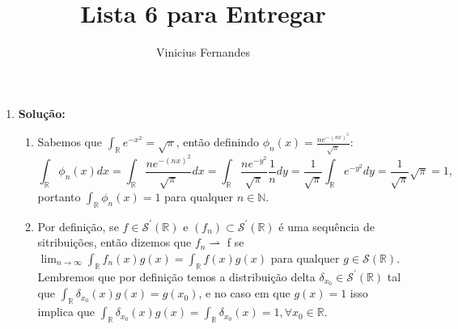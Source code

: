 \documentclass{article}
\begin{document}
	
	\title{Lista 6 para Entregar}
	\author{Vinicius Fernandes}
	
	\maketitle
	
	\begin{enumerate}
		
		\item \textbf{Solução:} 
			\begin{enumerate}
				\item Sabemos que $\int_{\mathbb{R}} e^{-x^{2}} = \sqrt{\pi}$, então definindo $\phi_{n}(x) = \frac{ne^{-(nx)^{2}}}{\sqrt{\pi}}$:
				$$
				\int_{\mathbb{R}}\phi_{n}(x)dx= 				\int_{\mathbb{R}} \frac{ne^{-(nx)^{2}}}{\sqrt{\pi}} dx = \int_{\mathbb{R}} \frac{ne^{-y^{2}}}{\sqrt{\pi}} \frac{1}{n} dy = \frac{1}{\sqrt{\pi}} \int_{\mathbb{R}} e^{-y^{2}} dy = \frac{1}{\sqrt{\pi}}  \sqrt{\pi} = 1,
				$$
				portanto $\int_{\mathbb{R}}\phi_{n}(x) = 1$ para qualquer $n \in \mathbb{N}$.
				
				\item Por definição, se $f \in \mathcal{S}^{'}(\mathbb{R})$ e $(f_{n}) \subset \mathcal{S}^{'}(\mathbb{R})$ é uma sequência de sitribuições, então dizemos que $f_{n} \rightharpoonup$ f se $\lim_{n \to \infty} \int_{\mathbb{R}}f_{n}(x)g(x) = \int_{\mathbb{R}}f(x)g(x)$ para qualquer $g \in \mathcal{S}(\mathbb{R})$. Lembremos que por definição temos a distribuição delta $\delta_{x_{0}} \in \mathcal{S}^{'}(\mathbb{R})$ tal que $\int_{\mathbb{R}}\delta_{x_0}(x)g(x) = g(x_{0})$, e no caso em que $g(x) = 1$ isso implica que $\int_{\mathbb{R}}\delta_{x_0}(x)g(x) = \int_{\mathbb{R}}\delta_{x_0}(x) = 1, \forall x_{0} \in \mathbb{R}$.
				

\end{enumerate}
\end{enumerate}
\end{document}
